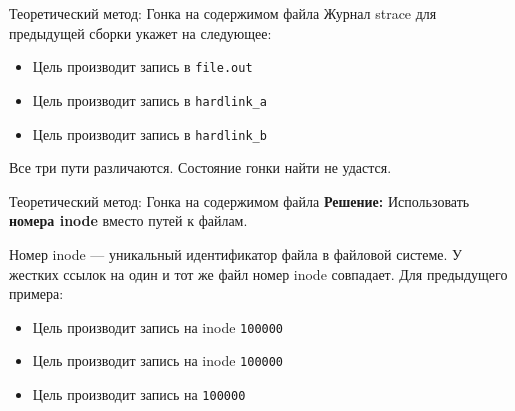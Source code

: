     \begin{frame}[label=current]{Теоретический метод: Гонка на содержимом файла}
        Журнал strace для предыдущей сборки укажет на следующее:

        \begin{itemize}
            \item Цель  производит запись в \texttt{file.out}
            \item Цель  производит запись в \texttt{hardlink\_a}
            \item Цель  производит запись в \texttt{hardlink\_b}
        \end{itemize}

        Все три пути различаются. Состояние гонки найти не удастся.


    \end{frame}

    \begin{frame}[label=current]{Теоретический метод: Гонка на содержимом файла}
        \textbf{Решение:} Использовать \textbf{номера inode} вместо путей к файлам.

        Номер inode --- уникальный идентификатор файла в файловой системе. У жестких ссылок на один и тот же файл номер inode совпадает. Для предыдущего примера:

        \begin{itemize}
            \item Цель  производит запись на inode \texttt{100000}
            \item Цель  производит запись на inode \texttt{100000}
            \item Цель  производит запись на \texttt{100000}
        \end{itemize}

    \end{frame}

